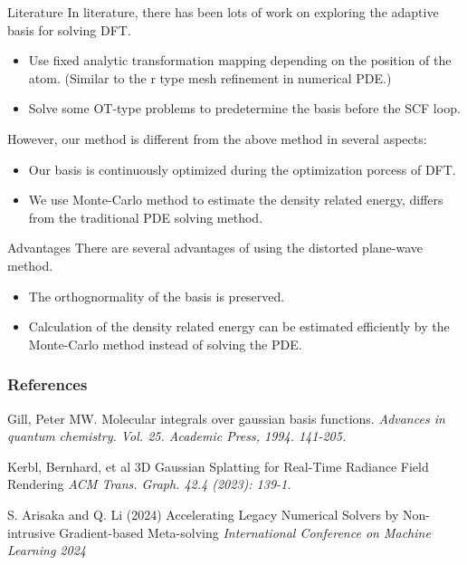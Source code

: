 \documentclass[paper slide]{beamer}
\begin{document}
\begin{frame}{Literature}
	In literature, there has been lots of work on exploring the adaptive basis for
	solving DFT. 
	\begin{itemize}
		\item Use fixed analytic transformation mapping depending on the position of the
		atom. (Similar to the r type mesh refinement in numerical PDE.)
		\item Solve some OT-type problems to predetermine the basis before the SCF
		loop.
	\end{itemize}
	However, our method is different from the above method in several aspects:
	\begin{itemize}
		\item Our basis is continuously optimized during the optimization porcess of
		DFT.
		\item We use Monte-Carlo method to estimate the density related energy,
		differs from the traditional PDE solving method.
	\end{itemize}
\end{frame}

\begin{frame}{Advantages}
	There are several advantages of using the distorted plane-wave method.
	\begin{itemize}
		\item The orthognormality of the basis is preserved.
		\item Calculation of the density related energy can be estimated 
		efficiently by the Monte-Carlo method instead of solving the PDE.
	\end{itemize}
\end{frame}

\begin{frame} %
    \frametitle{References}
 
    \begin{thebibliography}{99} %
        \footnotesize %
 
		Gill, Peter MW.
		\newblock Molecular integrals over gaussian basis functions.
		\newblock \emph{Advances in quantum chemistry. Vol. 25. Academic Press,
		1994. 141-205.}

		Kerbl, Bernhard, et al
		\newblock 3D Gaussian Splatting for Real-Time Radiance Field Rendering
		\newblock \emph{ACM Trans. Graph. 42.4 (2023): 139-1.}

		S. Arisaka and Q. Li (2024)
		\newblock Accelerating Legacy Numerical Solvers by Non-intrusive Gradient-based Meta-solving
		\newblock \emph{International Conference on Machine Learning 2024}
 
        
    \end{thebibliography}
\end{frame}
\end{document}
